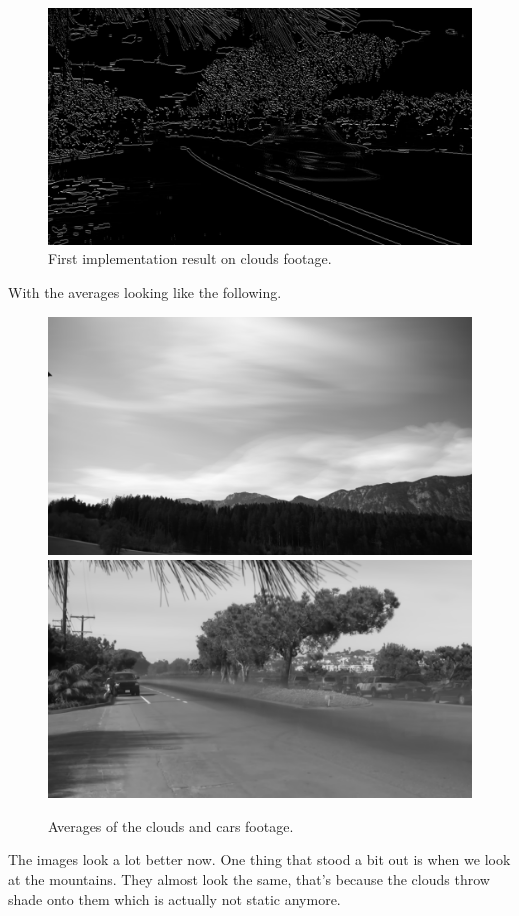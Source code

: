 \documentclass[UTF-8]{article}
\begin{document}
\begin{figure}[H]
	\centering
	\includegraphics[width=0.7\linewidth]{_images/spatiotemporal_snd2}
	\caption{First implementation result on clouds footage.}
	\label{fig:spatiotemporalsecond2}
\end{figure}

With the averages looking like the following.

\begin{figure}[H]
	\centering
	\includegraphics[width=0.7\linewidth]{_images/averageImage_spatiotemporalClouds3.png}
	\includegraphics[width=0.7\linewidth]{_images/averageImage_spatiotemporalCars.png}
	\caption{Averages of the clouds and cars footage.}
	\label{fig:spatiotemporalsecondavg}
\end{figure}

The images look a lot better now. One thing that stood a bit out is when we look at the mountains. They almost look the same, that's because the clouds throw shade onto them which is actually not static anymore.
\end{document}
